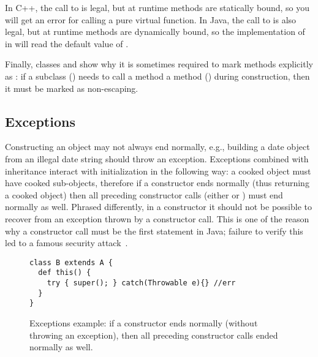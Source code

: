 In C++, the call to  is legal,
    but at runtime
    methods are statically bound,
    so you will get an error for calling a pure virtual function.
In Java, the call to  is also legal,
    but at runtime
    methods are dynamically bound,
    so the implementation of  in 
    will read the default value of .

Finally, classes  and  show why it is sometimes required to mark
    methods explicitly as :
    if a subclass () needs to call a method a method ()
    during construction, then it must be marked as non-escaping.




\subsection{Exceptions}
Constructing an object may not always end normally,
    e.g., building a date object from an illegal date string should throw an exception.
Exceptions combined with inheritance interact with initialization in the following way:
    a cooked object must have cooked sub-objects,
    therefore if a constructor ends normally (thus returning a cooked object)
    then all preceding constructor calls (either  or )
    must end normally as well.
Phrased differently, in a constructor it should not be possible to
    recover from an exception thrown by a constructor call.
This is one of the reason why a constructor call must be the first statement in Java;
    failure to verify this led to a famous security attack~\cite{Dean:1996}.

\begin{figure}
\begin{lstlisting}
class B extends A {
  def this() {
    try { super(); } catch(Throwable e){} //err
  }
}
\end{lstlisting}
\caption{Exceptions example:
    if a constructor ends normally (without throwing an exception),
        then all preceding constructor calls ended normally as well.
    }
\label{Figure:Exceptions}
\end{figure}


